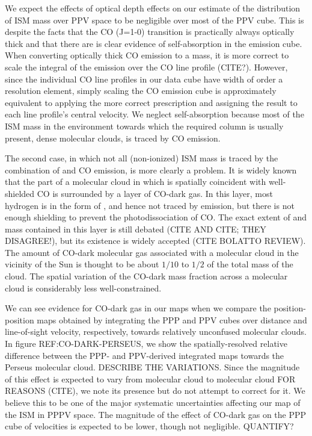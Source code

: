 We expect the effects of optical depth effects on our estimate of the distribution of ISM mass over PPV space to be negligible over most of the PPV cube. This is despite the facts that the CO (J=1-0) transition is practically always optically thick and that there are is clear evidence of \atomH self-absorption in the \atomH emission cube. When converting optically thick CO emission to a \molH mass, it is more correct to scale the integral of the emission over the CO line profile (CITE?). However, since the individual CO line profiles in our data cube have width of order a resolution element, simply scaling the CO emission cube is approximately equivalent to applying the more correct prescription and assigning the result to each line profile's central velocity. We neglect \atomH self-absorption because most of the ISM mass in the environment towards which the required \atomH column is usually present, dense molecular clouds, is traced by CO emission. 

The second case, in which not all (non-ionized) ISM mass is traced by the combination of \atomH and CO emission, is more clearly a problem. It is widely known that the part of a molecular cloud in which \molH is spatially coincident with well-shielded CO is surrounded by a layer of CO-dark gas. In this layer, most hydrogen is in the form of \molH, and hence not traced by \atomH emission, but there is not enough shielding to prevent the photodissociation of CO. The exact extent of and mass contained in this layer is still debated (CITE AND CITE; THEY DISAGREE!), but its existence is widely accepted (CITE BOLATTO REVIEW). The amount of CO-dark molecular gas associated with a molecular cloud in the vicinity of the Sun is thought to be about $1/10$ to $1/2$ of the total mass of the cloud. The spatial variation of the CO-dark mass fraction across a molecular cloud is considerably less well-constrained.

 We can see evidence for CO-dark gas in our maps when we compare the position-position maps obtained by integrating the PPP and PPV cubes over distance and line-of-sight velocity, respectively, towards relatively unconfused molecular clouds. In figure REF:CO-DARK-PERSEUS, we show the spatially-resolved relative difference between the PPP- and PPV-derived integrated maps towards the Perseus molecular cloud. DESCRIBE THE VARIATIONS. Since the magnitude of this effect is expected to vary from molecular cloud to molecular cloud FOR REASONS (CITE), we note its presence but do not attempt to correct for it. We believe this to be one of the major systematic uncertainties affecting our map of the ISM in PPPV space. The magnitude of the effect of CO-dark gas on the PPP cube of velocities is expected to be lower, though not negligible. QUANTIFY?

